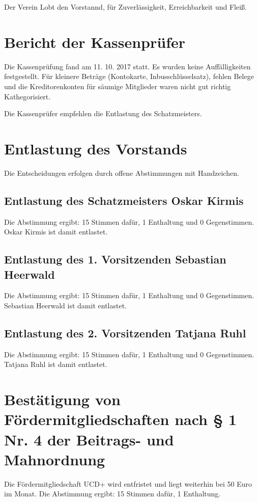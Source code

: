 \documentclass[a4paper,12pt,titlepage]{scrartcl}
\begin{document}
Der Verein Lobt den Vorstannd, für Zuverlässigkeit, Erreichbarkeit und Fleiß.

\section{ Bericht der Kassenprüfer }
Die Kassenprüfung fand am 11. 10. 2017 statt. Es wurden keine Auffälligkeiten festgestellt.
Für kleinere Beträge (Kontokarte, Inbusschlüsselsatz), fehlen Belege und die Kreditorenkonten für säumige Mitglieder waren nicht gut richtig Kathegorisiert.

Die Kassenprüfer empfehlen die Entlastung des Schatzmeisters.

\section{Entlastung des Vorstands}

Die Entscheidungen erfolgen durch offene Abstimmungen mit Handzeichen.

\subsection{Entlastung des Schatzmeisters Oskar Kirmis}

Die Abstimmung ergibt: 15 Stimmen dafür, 1 Enthaltung und 0 Gegenstimmen. Oskar Kirmis ist damit entlastet.

\subsection{Entlastung des 1. Vorsitzenden Sebastian Heerwald}

Die Abstimmung ergibt: 15 Stimmen dafür, 1 Enthaltung und 0 Gegenstimmen. Sebastian Heerwald ist damit entlastet.

\subsection{Entlastung des 2. Vorsitzenden Tatjana Ruhl}
Die Abstimmung ergibt: 15 Stimmen dafür, 1 Enthaltung und 0 Gegenstimmen. Tatjana Ruhl ist damit entlastet.

\section{Bestätigung von Fördermitgliedschaften nach § 1 Nr. 4 der Beitrags- und Mahnordnung}

Die Fördermitgliedschaft UCD+ wird entfristet und liegt weiterhin bei 50 Euro im Monat.
Die Abstimmung ergibt: 15 Stimmen dafür, 1 Enthaltung.
\end{document}
